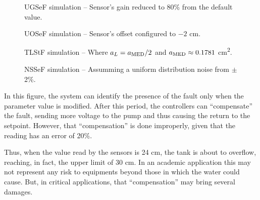 \documentclass[10pt,fleqn,a4paper]{article}
\begin{document}
\begin{figure}[htb]
    \begin{minipage}[b]{0.48\linewidth}
        \scalebox{0.65}{}
        \vspace{0.5cm}
        \caption{UGSeF simulation -- Sensor's gain reduced to 80\% from the
                 default value.}
        \label{fig:fsedg}
    \end{minipage}
    \hfill
    \begin{minipage}[b]{0.48\linewidth}
        \scalebox{0.65}{}
        \vspace{0.5cm}
        \caption{UOSeF simulation -- Sensor's offset configured to $-2$ cm.}
        \label{fig:fsedo}
    \end{minipage}
\end{figure}

\begin{figure}[htb]
    \begin{minipage}[b]{0.48\linewidth}
        \scalebox{0.65}{}
        \vspace{0.5cm}
        \caption{TLStF simulation -- Where $a_{\tiny L} = a_{\tiny
                 \text{MED}}/2$ and $a_{\tiny \text{MED}} \approx 0.1781$
                 cm\textsuperscript{2}.}
        \label{fig:fsivzt}
    \end{minipage}
    \hfill
    \begin{minipage}[b]{0.48\linewidth}
        \scalebox{0.65}{}
        \vspace{0.5cm}
        \caption{NSSeF simulation -- Assumming a uniform distribution noise from
                 $\pm$2\%.}
        \label{fig:fsesr}
    \end{minipage}
\end{figure}

In this figure, the system can identify the presence of the fault only when the
parameter value is modified. After this period, the controllers can
``compensate'' the fault, sending more voltage to the pump and thus causing the
return to the setpoint. However, that ``compensation'' is done improperly, given
that the reading has an error of 20\%.

Thus, when the value read by the sensors is 24 cm, the tank is about to
overflow, reaching, in fact, the upper limit of 30 cm. In an academic
application this may not represent any risk to equipments beyond those in which
the water could cause. But, in critical applications, that ``compensation''
may bring several damages.
\end{document}
